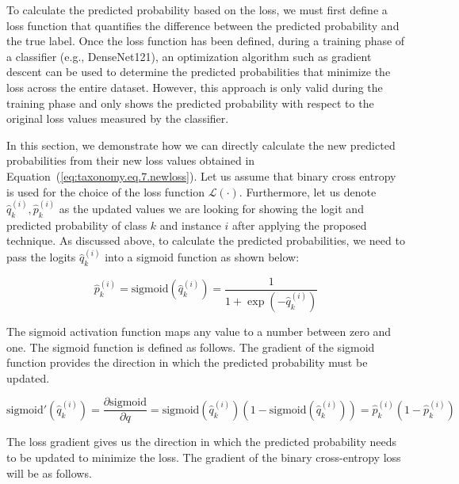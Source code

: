 To calculate the predicted probability based on the loss, we must first define a loss function that quantifies the difference between the predicted probability and the true label. Once the loss function has been defined, during a training phase of a classifier (e.g., DenseNet121), an optimization algorithm such as gradient descent can be used to determine the predicted probabilities that minimize the loss across the entire dataset. However, this approach is only valid during the training phase and only shows the predicted probability with respect to the original loss values measured by the classifier.

In this section, we demonstrate how we can directly calculate the new predicted probabilities from their new loss values obtained in Equation~(\ref{eq:taxonomy.eq.7.newloss}). Let us assume that binary cross entropy is used for the choice of the loss function $\mathcal{L}(\cdot) $. Furthermore, let us denote $\widehat{q}_k^{(i)} , \widehat{p}_k^{(i)} $ as the updated values we are looking for showing the logit and predicted probability of class $k $ and instance $i $ after applying the proposed technique. As discussed above, to calculate the predicted probabilities, we need to pass the logits ${\widehat q}_k^{(i)} $ into a sigmoid function as shown below:

\begin{equation}
    \label{eq:taxonomy.eq.9.sigmoid}
    \widehat{p}_k^{(i)}=\text{sigmoid}\left(\widehat{q}_k^{(i)}\right)=\frac1{1+\exp\left(-\widehat{q}_k^{(i)}\right)}
\end{equation}


The sigmoid activation function maps any value to a number between zero and one. The sigmoid function is defined as follows. The gradient of the sigmoid function provides the direction in which the predicted probability must be updated.

\begin{equation}
    \label{eq:taxonomy.eq.10.sigmoidprime}
    \text{sigmoid}'\left(\widehat{q}_k^{(i)}\right)=\frac{\partial{\text{sigmoid}}}{\partial{q}}=\text{sigmoid}\left(\widehat{q}_k^{(i)}\right)\left(1-\text{sigmoid}\left(\widehat{q}_k^{(i)}\right)\right)=\widehat{p}_k^{(i)}\left(1-\widehat{p}_k^{(i)}\right)
\end{equation}


The loss gradient gives us the direction in which the predicted probability needs to be updated to minimize the loss. The gradient of the binary cross-entropy loss will be as follows.

